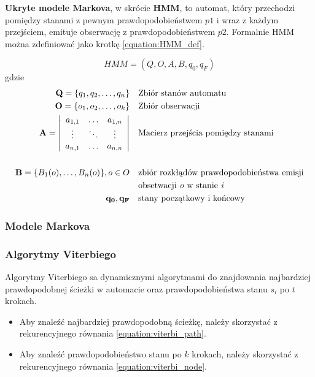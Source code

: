 \documentclass[11pt]{article}
\begin{document}
	    \textbf{Ukryte modele Markova}, w skrócie \textbf{HMM}, to automat, który przechodzi pomiędzy stanami z pewnym prawdopodobieństwem $p1$ i wraz z każdym przejściem, emituje obserwację z prawdopodobieństwem $p2$. Formalnie HMM można zdefiniować jako krotkę \ref{equation:HMM_def}.
	    
	    \begin{equation}
		    HMM = (Q, O, A, B, q_0, q_F)
		    \label{equation:HMM_def}
	    \end{equation}
	    gdzie
	    \begin{align*}
		    \mathbf{Q}=\{q_1, q_2,\ldots,q_n\} & &&  \text{Zbiór stanów automatu} \\
	 	    \mathbf{O}=\{o_1, o_2,\ldots,o_k\} & &&  \text{Zbiór obserwacji} \\
	 	    \mathbf{A} =
	 	    \left| \begin{array}{ccc}
		 	    a_{1,1} & \ldots & a_{1,n} \\
		 	    \vdots  & \ddots & \vdots\\
		 	    a_{n,1} & \ldots & a_{n,n}
	 	    \end{array} \right|
												 	    & &&  \text{Macierz przejścia pomiędzy stanami} \\
												 	    & && \\
	 	    \mathbf{B}=\{B_1(o),\ldots,B_n(o)\},o \in O & && \text{zbiór rozkłądów prawdopodobieństwa emisji} \\ 
													 	& && \text{obsetwacji \textit{o} w stanie \textit{i}} \\
		 	\mathbf{q_0, q_F}				  & && \text{stany początkowy i końcowy}
	    \end{align*}
	    
    	
	    	
	   \subsubsection{Modele Markova}
	   \subsubsection{Algorytmy Viterbiego}
		   \label{sec:Viterbi}
		   Algorytmy Viterbiego sa dynamicznymi algorytmami do znajdowania najbardziej prawdopodobnej ścieżki w automacie oraz prawdopodobieństwa stanu $s_i$ po $t$ krokach. 
		   
		   \begin{itemize}
			   	\item Aby znaleźć najbardziej prawdopodobną ścieżkę, należy skorzystać z rekurencyjnego równania \ref{equation:viterbi_path}.
			   	\item Aby znaleźć prawdopodobieństwo stanu po $k$ krokach, należy skorzystać z rekurencyjnego równania \ref{equation:viterbi_node}.
		   \end{itemize}
	   	   
\end{document}
